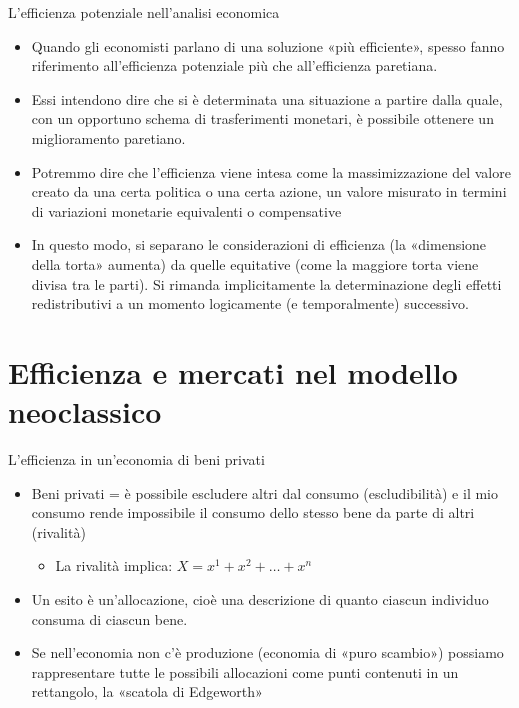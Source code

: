 \documentclass[aspectratio=64,11pt]{beamer}
\begin{document}
\begin{frame}{L'efficienza potenziale nell'analisi economica}
\begin{itemize}
\item Quando gli economisti parlano di una soluzione «più efficiente», spesso fanno riferimento all’efficienza potenziale più che all’efficienza paretiana.
\item Essi intendono dire che si è determinata una situazione a partire dalla quale, con un opportuno schema di trasferimenti monetari, è possibile ottenere un miglioramento paretiano.
\item Potremmo dire che l’efficienza viene intesa come la massimizzazione del valore creato da una certa politica o una certa azione, un valore misurato in termini di variazioni monetarie equivalenti o compensative
\item In questo modo, si separano le considerazioni di efficienza (la «dimensione della torta» aumenta) da quelle equitative (come la maggiore torta viene divisa tra le parti). Si rimanda implicitamente la determinazione degli effetti redistributivi a un momento logicamente (e temporalmente) successivo.
\end{itemize}
\end{frame}
\section{Efficienza e mercati nel modello neoclassico}

\begin{frame}{L'efficienza in un'economia di beni privati}
\begin{itemize}
\item \alert{Beni privati} = è possibile escludere altri dal consumo (escludibilità) e il
mio consumo rende impossibile il consumo dello stesso bene da parte di altri
(rivalità)
\begin{itemize}
\item La rivalità implica: $X = x^1 + x^2 + \dots + x^n$
\end{itemize}
\item Un esito è un'\alert{allocazione}, cioè una descrizione di quanto ciascun individuo
consuma di ciascun bene.
\item Se nell’economia non c’è produzione (economia di «puro scambio») possiamo
rappresentare tutte le possibili allocazioni come punti contenuti in un
rettangolo, la «scatola di Edgeworth»
\end{itemize}
\end{frame}
\end{document}
